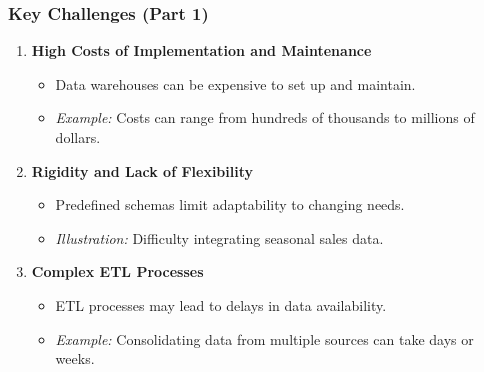 \documentclass[aspectratio=169]{beamer}
\begin{document}
\begin{frame}[fragile]
    \frametitle{Key Challenges (Part 1)}
    \begin{enumerate}
        \item \textbf{High Costs of Implementation and Maintenance}
        \begin{itemize}
            \item Data warehouses can be expensive to set up and maintain.
            \item \textit{Example:} Costs can range from hundreds of thousands to millions of dollars.
        \end{itemize}
        
        \item \textbf{Rigidity and Lack of Flexibility}
        \begin{itemize}
            \item Predefined schemas limit adaptability to changing needs.
            \item \textit{Illustration:} Difficulty integrating seasonal sales data.
        \end{itemize}
        
        \item \textbf{Complex ETL Processes}
        \begin{itemize}
            \item ETL processes may lead to delays in data availability.
            \item \textit{Example:} Consolidating data from multiple sources can take days or weeks.
        \end{itemize}
    \end{enumerate}
\end{frame}
\end{document}
